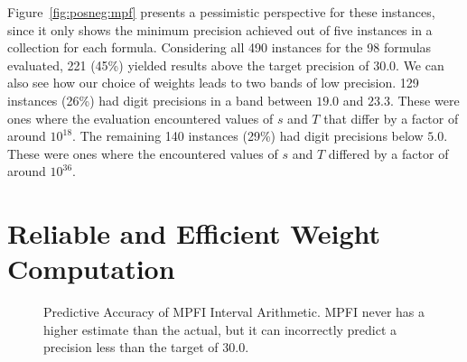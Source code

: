 \documentclass[letterpaper,USenglish,cleveref, autoref, thm-restate]{lipics-v2021}
\begin{document}
Figure~\ref{fig:posneg:mpf} presents a pessimistic
perspective for these instances, since it only shows the minimum
precision achieved out of five instances in a collection for each formula.  Considering all 490 instances
for the 98 formulas evaluated, 221 (45\%) yielded results above the
target precision of $30.0$.  We can also see how our choice of weights
leads to two bands of low precision.  129 instances (26\%) had digit
precisions in a band between $19.0$ and $23.3$.  These were ones where
the evaluation encountered values of $s$ and $T$ that
differ by a factor of around $10^{18}$.  The remaining 140 instances
(29\%) had digit precisions below $5.0$.  These were ones where the
encountered values of $s$ and $T$ differed by a factor of around
 $10^{36}$.

\section{Reliable and Efficient Weight Computation}
\label{sect:reliable}

\begin{figure}
\caption{Predictive Accuracy of MPFI Interval Arithmetic.  MPFI never has a higher estimate than the actual, but it can
incorrectly predict a precision less than the target of 30.0.}
\label{fig:mpfi}
\end{figure}
\end{document}
